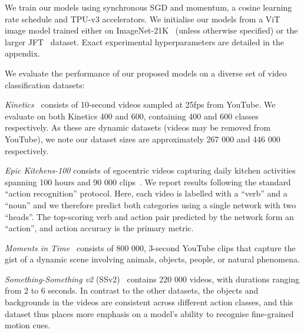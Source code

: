 \documentclass[10pt,twocolumn,letterpaper]{article}
\makeatletter
\renewcommand{\paragraph}{\@startsection{paragraph}{4}{\z@}{1.625ex \@plus 1ex \@minus .2ex}{-1em}{\normalfont\normalsize\bfseries}}
\makeatother
\begin{document}
We train our models using synchronous SGD and momentum, a cosine learning rate schedule and TPU-v3 accelerators. We initialise our models from a ViT image model trained either on ImageNet-21K~\cite{deng_cvpr_2009} (unless otherwise specified) or the larger JFT~\cite{sun_iccv_2017} dataset.
Exact experimental hyperparameters are detailed in the appendix.

\paragraph{Datasets}

We evaluate the performance of our proposed models on a diverse set of video classification datasets:

\emph{Kinetics}~\cite{kay_arxiv_2017} consists of 10-second videos sampled at 25fps from YouTube.
We evaluate on both Kinetics 400 and 600, containing 400 and 600 classes respectively.
As these are dynamic datasets (videos may be removed from YouTube), we note our dataset sizes are approximately 267 000 and 446 000 respectively.

\emph{Epic Kitchens-100} consists of egocentric videos capturing daily kitchen activities spanning 100 hours and 90 000 clips~\cite{damen_arxiv_2020}.
We report results following the standard ``action recognition'' protocol.
Here, each video is labelled with a ``verb'' and a ``noun'' and we therefore predict both categories using a single network with two ``heads''. The top-scoring verb and action pair predicted by the network form an ``action'', and action accuracy is the primary metric.

\emph{Moments in Time}~\cite{monfort_pami_2019} consists of 800 000,  3-second YouTube clips that capture the gist of a dynamic scene involving animals, objects, people, or natural phenomena. 

\emph{Something-Something v2} (SSv2)~\cite{goyal_iccv_2017} contains 220 000 videos, with durations ranging from 2 to 6 seconds.
In contrast to the other datasets, the objects and backgrounds in the videos are consistent across different action classes, and this dataset thus places more emphasis on a model's ability to recognise fine-grained motion cues.
\end{document}
